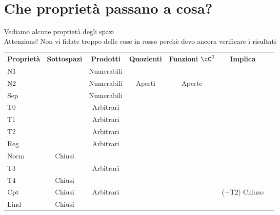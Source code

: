 \documentclass[a4paper,NoNotes,GeneralMath]{stdmdoc}
\newcommand{\Arbitrari}{Arbitrari}
\newcommand{\Numerabili}{Numerabili}
\newcommand{\rd}[1]{{\color{red} #1 }}
\begin{document}
	\section*{Che proprietà passano a cosa?}
	Vediamo alcune proprietà degli spazi \\
	Attenzione! Non vi fidate troppo delle cose in rosso perchè devo ancora verificare i risultati \\
	\begin{tabular}{lcccccc}
	{\bf Proprietà} & {\bf Sottospazi} & {\bf Prodotti} & {\bf Quozienti} & {\bf Funzioni $\cC^0$} & {\bf Implica} \\
	N1              & \rd\checkmark    & \rd\Numerabili &                 &                        &               \\ \hline
	N2              & \rd\checkmark    & \rd\Numerabili & \rd{Aperti}     & \rd{Aperte}            &               \\ \hline
	Sep             & \rd\crossmark    & \rd\Numerabili &                 & \rd\checkmark          &               \\ \hline
	T0              & \rd\checkmark    & \rd\Arbitrari  &                 &                        &               \\ \hline

	T1              & \rd\checkmark    & \rd\Arbitrari  &                 &                        &               \\ \hline
	T2              & \rd\checkmark    & \rd\Arbitrari  &                 &                        &               \\ \hline
	Reg             & \rd\checkmark    & \rd\Arbitrari  &                 &                        &               \\ \hline
	Norm            & \rd{Chiusi}      & \rd\crossmark  &                 &                        &               \\ \hline

	T3              & \rd\checkmark    & \rd\Arbitrari  &                 &                        &               \\ \hline
	T4              & \rd{Chiusi}      & \rd\crossmark  &                 &                        &               \\ \hline
	Cpt             & \rd{Chiusi}      & \rd\Arbitrari  &                 & \checkmark             & (+T2) Chiuso  \\ \hline
	Lind            & \rd{Chiusi}      & \rd\crossmark  &                 &                        &               \\ \hline


\end{tabular}
\end{document}
